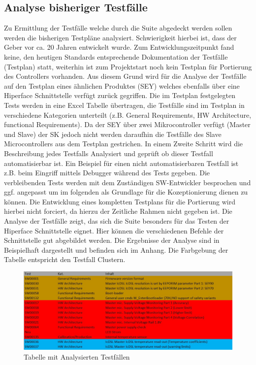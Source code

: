 \subsection{Analyse bisheriger Testfälle}
Zu Ermittlung der Testfälle welche durch die Suite abgedeckt werden sollen werden die bisherigen Testpläne analysiert. Schwierigkeit hierbei ist, dass der Geber vor ca. 20 Jahren entwickelt wurde. Zum Entwicklungszeitpunkt fand keine, den heutigen Standards entsprechende Dokumentation der Testfälle (Testplan) statt, weiterhin ist zum Projektstart noch kein Testplan für Portierung des Controllers vorhanden. Aus diesem Grund wird für die Analyse der Testfälle auf den Testplan eines ähnlichen Produktes (SEY) welches ebenfalls über eine Hiperface Schnittstelle verfügt zurück gegriffen.\newline
	Die im Testplan festgelegten Tests werden in eine Excel Tabelle übertragen, die Testfälle sind im Testplan in verschiedene Kategorien unterteilt (z.B. General Requirements, HW Architecture, functional Requirements). Da der SEY über zwei Mikrocontroller verfügt (Master und Slave) der SK jedoch nicht werden daraufhin die Testfälle des Slave Microcontrollers aus dem Testplan gestrichen. In einem Zweite Schritt wird die Beschreibung jedes Testfalls Analysiert und geprüft ob dieser Testfall automatisierbar ist. Ein Beispiel für einen nicht automatisierbaren Testfall ist z.B. beim Eingriff mittels Debugger während des Tests gegeben. Die verbleibenden Tests werden mit dem Zuständigen SW-Entwickler besprochen und ggf. angepasst um im folgenden als Grundlage für die Kozeptionierung dienen zu können. Die Entwicklung eines kompletten Testplans für die Portierung wird hierbei nicht forciert, da hierzu der Zeitliche Rahmen nicht gegeben ist. Die 
Analyse der Testfälle zeigt, das sich die Suite besonders für das Testen der Hiperface Schnittstelle eignet. Hier können die verschiedenen Befehle der Schnittstelle gut abgebildet werden. Die Ergebnisse der Analyse sind in \dq {}\dq   Beispielhaft dargestellt und befinden sich im Anhang. Die Farbgebung der Tabelle entspricht den Testfall Clustern.
\begin{figure}[h]
	\centering
  \includegraphics[width=1.25\textwidth, angle=90]{img/Tests_Cluster.jpg} 
   \caption{Tabelle mit Analysierten Testfällen}
  \label{fig:Analyse.jpg}
\end{figure}

